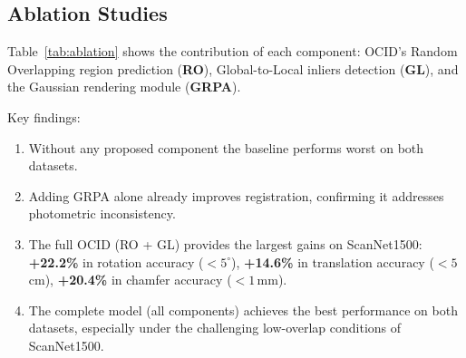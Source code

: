 \documentclass[11pt,a4paper]{article}
\begin{document}
\subsection{Ablation Studies}

Table~\ref{tab:ablation} shows the contribution of each component: OCID's Random
Overlapping region prediction (\textbf{RO}), Global-to-Local inliers detection
(\textbf{GL}), and the Gaussian rendering module (\textbf{GRPA}).

Key findings:
\begin{enumerate}[noitemsep]
  \item Without any proposed component the baseline performs worst on both datasets.
  \item Adding GRPA alone already improves registration, confirming it addresses photometric inconsistency.
  \item The full OCID (RO + GL) provides the largest gains on ScanNet1500:
    \textbf{+22.2\%} in rotation accuracy ($< 5^\circ$), \textbf{+14.6\%} in translation
    accuracy ($< 5\,$cm), \textbf{+20.4\%} in chamfer accuracy ($< 1\,$mm).
  \item The complete model (all components) achieves the best performance on both datasets,
    especially under the challenging low-overlap conditions of ScanNet1500.
\end{enumerate}
\end{document}
